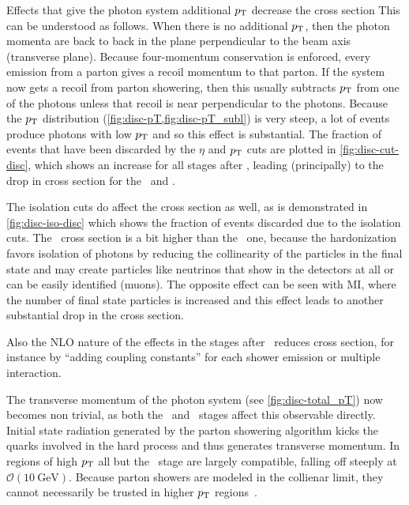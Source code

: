 Effects that give the photon system additional $p_\mathrm{T}$ decrease the
cross section This can be understood as follows. When there is no
additional \(p_\mathrm{T}\), then the photon momenta are back to back in the
plane perpendicular to the beam axis (transverse plane). Because
four-momentum conservation is enforced, every emission from a parton
gives a recoil momentum to that parton. If the system now gets a
recoil from parton showering, then this usually subtracts \(p_\mathrm{T}\) from
one of the photons unless that recoil is near perpendicular to the
photons. Because the \(p_\mathrm{T}\) distribution
(\cref{fig:disc-pT,fig:disc-pT_subl}) is very steep, a lot of events
produce photons with low \(p_\mathrm{T}\) and so this effect is
substantial. The fraction of events that have been discarded by the
\(\eta\) and \(p_\mathrm{T}\) cuts are plotted in \cref{fig:disc-cut-disc},
which shows an increase for all stages after \stone, leading
(principally) to the drop in cross section for the \sttwo\ and
\stthree.

The isolation cuts do affect the cross section as well, as is
demonstrated in \cref{fig:disc-iso-disc} which shows the fraction of
events discarded due to the isolation cuts. The \stfour\ cross section
is a bit higher than the \stthree\ one, because the hardonization
favors isolation of photons by reducing the collinearity of the
particles in the final state and may create particles like neutrinos
that show in the detectors at all or can be easily identified
(muons). The opposite effect can be seen with MI, where the number of
final state particles is increased and this effect leads to another
substantial drop in the cross section.

Also the NLO nature of the effects in the stages after \stone\ reduces
cross section, for instance by ``adding coupling constants'' for each
shower emission or multiple interaction.

The transverse momentum of the photon system (see
\cref{fig:disc-total_pT}) now becomes non trivial, as both the \sttwo\
and \stthree\ stages affect this observable directly. Initial state
radiation generated by the parton showering algorithm kicks the quarks
involved in the hard process and thus generates transverse momentum.
In regions of high \(p_\mathrm{T}\) all but the \stone\ stage are largely
compatible, falling off steeply at
\(\mathcal{O}(\SI{10}{\giga\electronvolt})\). Because parton showers
are modeled in the collienar limit, they cannot necessarily be trusted
in higher \(p_\mathrm{T}\) regions~\cite{buckley:2011ge}.

